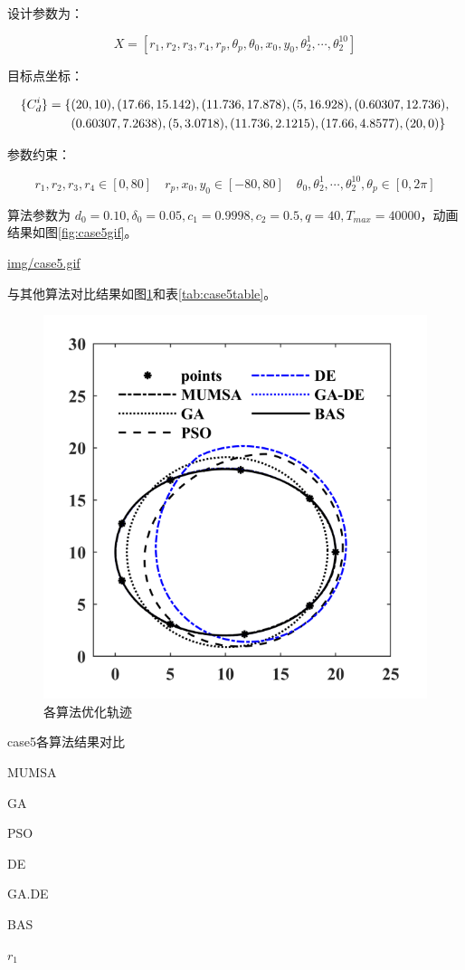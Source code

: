 \documentclass[]{ctexbook}
\theoremstyle{definition}
\theoremstyle{definition}
\theoremstyle{definition}
\theoremstyle{remark}
\begin{document}
设计参数为：

\[
X = [r_1,r_2,r_3,r_4,r_p,\theta_p,\theta_0,x_0,y_0,\theta_2^1,\cdots,\theta_2^{10}]
\]

目标点坐标：

\begin{align}
\{C_d^i\} = \{&(20,10),(17.66,15.142),(11.736,17.878),(5,16.928),(0.60307,12.736), \notag \\
&(0.60307,7.2638),(5,3.0718),(11.736,2.1215),(17.66,4.8577),(20,0)\}\notag\\
\end{align}

参数约束：

\[
r_1,r_2,r_3,r_4\in[0,80]\quad r_p,x_0,y_0\in[-80,80]\quad \theta_0,\theta_2^1,\cdots,\theta_2^{10},\theta_p\in[0,2\pi]
\]

算法参数为
\(d_0 = 0.10,\delta_0=0.05,c_1=0.9998,c_2=0.5,q=40,T_{max}=40000\)，动画结果如图\ref{fig:case5gif}。

\url{img/case5.gif}

与其他算法对比结果如图\ref{fig:case5png}和表\ref{tab:case5table}。

\begin{figure}

{\centering \includegraphics[width=0.5\linewidth]{img/case5png} 

}

\caption{各算法优化轨迹}\label{fig:case5png}
\end{figure}

\label{tab:case5table}case5各算法结果对比

MUMSA

GA

PSO

DE

GA.DE

BAS

\(r_1\)
\end{document}
